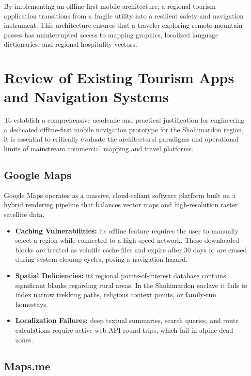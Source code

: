 \documentclass[12pt,a4paper,oneside]{report}
\begin{document}
By implementing an offline-first mobile architecture, a regional tourism application
transitions from a fragile utility into a resilient safety and navigation instrument.
This architecture ensures that a traveler exploring remote mountain passes has
uninterrupted access to mapping graphics, localized language dictionaries, and regional
hospitality vectors.

\section{Review of Existing Tourism Apps and Navigation Systems}

To establish a comprehensive academic and practical justification for engineering a
dedicated offline-first mobile navigation prototype for the Shohimardon region, it is
essential to critically evaluate the architectural paradigms and operational limits of
mainstream commercial mapping and travel platforms.

\subsection{Google Maps}

Google Maps operates as a massive, cloud-reliant software platform built on a hybrid
rendering pipeline that balances vector maps and high-resolution raster satellite data.

\begin{itemize}[leftmargin=1.4em]
  \item \textbf{Caching Vulnerabilities:} its offline feature requires the user to
        manually select a region while connected to a high-speed network. These downloaded
        blocks are treated as volatile cache files and expire after 30 days or are erased
        during system cleanup cycles, posing a navigation hazard.
  \item \textbf{Spatial Deficiencies:} its regional points-of-interest database contains
        significant blanks regarding rural areas. In the Shohimardon enclave it fails to
        index narrow trekking paths, religious context points, or family-run homestays.
  \item \textbf{Localization Failures:} deep textual summaries, search queries, and route
        calculations require active web API round-trips, which fail in alpine dead zones.
\end{itemize}

\subsection{Maps.me}
\end{document}
